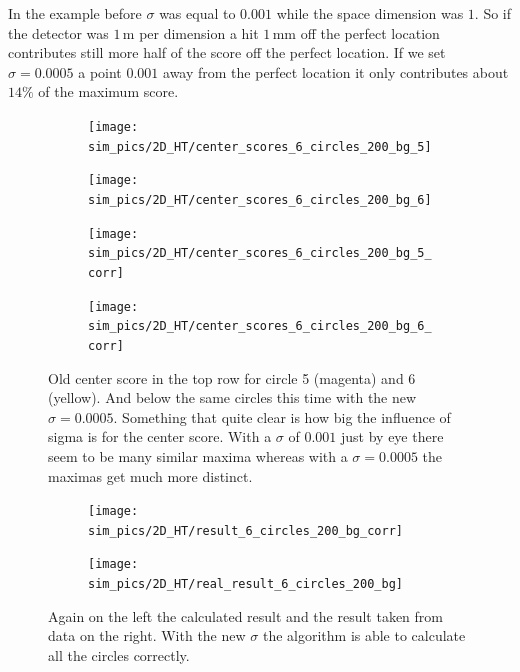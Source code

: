 \documentclass[11pt,twoside]{scrreprt}
\begin{document}
In the example before $\sigma$ was equal to $0.001$ while the space dimension was $1$. So if the detector was $1$\,m per dimension a hit $1$\,mm off the perfect location contributes still more half of the score off the perfect location. If we set $\sigma=0.0005$ a point $0.001$ away from the perfect location it only contributes about $14\%$ of the maximum score.

\begin{figure}
\centering
  \begin{subfigure}{.49\textwidth}

    \texttt{[image: sim\_pics/2D\_HT/center\_scores\_6\_circles\_200\_bg\_5]}
  \end{subfigure}
  \begin{subfigure}{.49\textwidth}

    \texttt{[image: sim\_pics/2D\_HT/center\_scores\_6\_circles\_200\_bg\_6]}
  \end{subfigure}

  \begin{subfigure}{.49\textwidth}

    \texttt{[image: sim\_pics/2D\_HT/center\_scores\_6\_circles\_200\_bg\_5\_corr]}
  \end{subfigure}
  \begin{subfigure}{.49\textwidth}

    \texttt{[image: sim\_pics/2D\_HT/center\_scores\_6\_circles\_200\_bg\_6\_corr]}
  \end{subfigure}
  \caption{Old center score in the top row for circle 5 (magenta) and 6 (yellow). And below the same circles this time with the new $\sigma=0.0005$. Something that quite clear is how big the influence of sigma is for the center score. With a $\sigma$ of $0.001$ just by eye there seem to be many similar maxima whereas with a $\sigma=0.0005$ the maximas get much more distinct.}
\end{figure}

\begin{figure}
\centering
\begin{subfigure}{0.49\textwidth}
  \texttt{[image: sim\_pics/2D\_HT/result\_6\_circles\_200\_bg\_corr]}
\end{subfigure}
\begin{subfigure}{0.49\textwidth}
  \texttt{[image: sim\_pics/2D\_HT/real\_result\_6\_circles\_200\_bg]}
\end{subfigure}
\caption{Again on the left the calculated result and the result taken from data on the right. With the new $\sigma$ the algorithm is able to calculate all the circles correctly.}\label{2d_result_6c_200bg_corr}
\end{figure}
\end{document}
